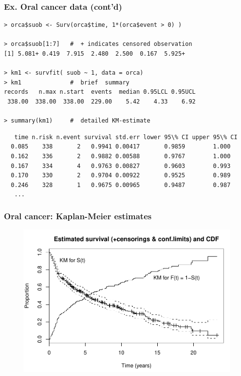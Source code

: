 \documentclass[handout,12pt,dvipsnames,t]{beamer}
\begin{document}
\begin{frame}[fragile]
\frametitle{Ex. Oral cancer data  (cont'd)}

\small
\begin{verbatim}
> orca$suob <- Surv(orca$time, 1*(orca$event > 0) )

> orca$suob[1:7]   #  + indicates censored observation
[1] 5.081+ 0.419  7.915  2.480  2.500  0.167  5.925+

> km1 <- survfit( suob ~ 1, data = orca)
> km1              #  brief  summary
records   n.max n.start  events  median 0.95LCL 0.95UCL 
 338.00  338.00  338.00  229.00    5.42    4.33    6.92 
 
> summary(km1)     #  detailed KM-estimate
\end{verbatim}
\scriptsize
\begin{verbatim}
   time n.risk n.event survival std.err lower 95\% CI upper 95\% CI
  0.085    338       2   0.9941 0.00417       0.9859        1.000
  0.162    336       2   0.9882 0.00588       0.9767        1.000
  0.167    334       4   0.9763 0.00827       0.9603        0.993
  0.170    330       2   0.9704 0.00922       0.9525        0.989
  0.246    328       1   0.9675 0.00965       0.9487        0.987
   ...  
\end{verbatim}

\normalsize

\end{frame}

\begin{frame}[fragile]
\frametitle{Oral cancer: Kaplan-Meier estimates}

\begin{figure}
\centering
\includegraphics[width=1.0\textwidth]{orcaKM1} 
\end{figure}

\end{frame}
\end{document}
